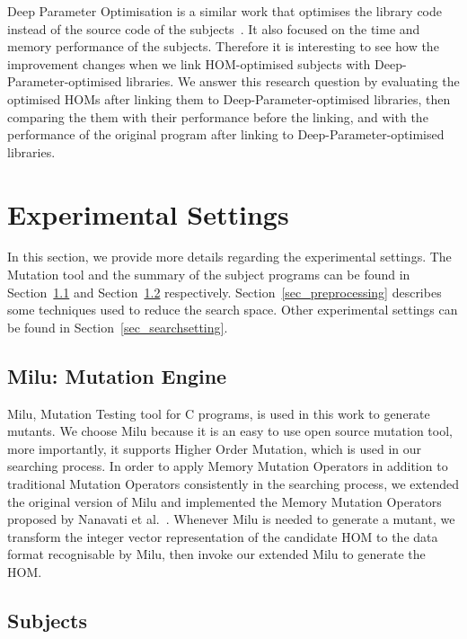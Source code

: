 \documentclass[oribibl]{llncs}
\begin{document}
Deep Parameter Optimisation is a similar work that optimises the library code instead of the source code of the subjects~\cite{Wu:2015:DPO:2739480.2754648}.
It also focused on the time and memory performance of the subjects.
Therefore it is interesting to see how the improvement changes when we link HOM-optimised subjects with Deep-Parameter-optimised libraries.
We answer this research question by evaluating the optimised HOMs after linking them to Deep-Parameter-optimised libraries, then comparing the them with their performance before the linking, and with the performance of the original program after linking to Deep-Parameter-optimised libraries.

\section{Experimental Settings}
\label{sec_exp}

In this section, we provide more details regarding the experimental settings.
The Mutation tool and the summary of the subject programs can be found in Section~\ref{sec_milu} and Section~\ref{sec_subject} respectively.
Section~\ref{sec_preprocessing} describes some techniques used to reduce the search space.
Other experimental settings can be found in Section~\ref{sec_searchsetting}.

\subsection{Milu: Mutation Engine}
\label{sec_milu}

Milu, Mutation Testing tool for C programs, is used in this work to generate mutants.
We choose Milu because it is an easy to use open source mutation tool, more importantly, it supports Higher Order Mutation, which is used in our searching process.
In order to apply Memory Mutation Operators in addition to traditional Mutation Operators consistently in the searching process, we extended the original version of Milu and implemented the Memory Mutation Operators proposed by Nanavati et al.~\cite{7107449}.
Whenever Milu is needed to generate a mutant, we transform the integer vector representation of the candidate HOM to the data format recognisable by Milu, then invoke our extended Milu to generate the HOM.

\subsection{Subjects}
\label{sec_subject}
\end{document}
